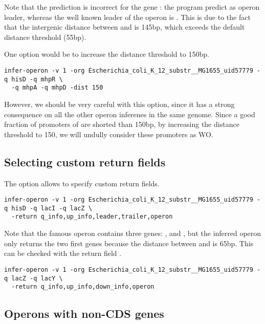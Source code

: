 Note that the prediction is incorrect for the gene : the
program predict  as operon leader, whereas the well known
leader of the  operon is . This is due to the
fact that the intergenic distance between  and 
is 145bp, which exceeds the default distance threshold (55bp). 

One option would be to increase the distance threshold to 150bp. 


\begin{lstlisting}
infer-operon -v 1 -org Escherichia_coli_K_12_substr__MG1655_uid57779 -q hisD -q mhpR \
  -q mhpA -q mhpD -dist 150
\end{lstlisting}

However, we should be very careful with this option, since it has a
strong consequence on all the other operon inferenes in the same
genome. Since a good fraction of promoters of 
are shorted than 150bp, by increasing the distance threshold to 150,
we will undully consider these promoters as WO.

\subsection{Selecting custom return fields}

The option  allows to specify custom return fields.

\begin{lstlisting}
infer-operon -v 1 -org Escherichia_coli_K_12_substr__MG1655_uid57779 -q hisD -q lacI -q lacZ \
  -return q_info,up_info,leader,trailer,operon
\end{lstlisting}

Note that the famous  operon contains three genes:
,  and , but the inferred operon only
returns the two first genes because the distance between 
and \gene{lacA} is 65bp. This can be checked with the return field
\option{down\_info}.

\begin{lstlisting}
infer-operon -v 1 -org Escherichia_coli_K_12_substr__MG1655_uid57779 -q lacZ -q lacY \
  -return q_info,up_info,down_info,operon
\end{lstlisting}

\subsection{Operons with non-CDS genes}

